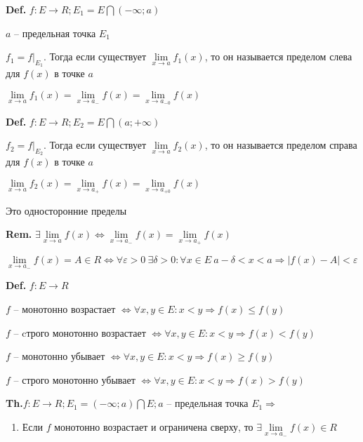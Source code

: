\documentclass[14pt, letter paper]{article}
\begin{document}
\textbf{Def.} $f : E \rightarrow R; E_1 = E \bigcap (-\infty; a)$

$a$ -- предельная точка $E_1$

$f_1 = f|_{E_1}$. Тогда если существует $\lim\limits_{x \rightarrow a}{f_1(x)}$, то он называется пределом слева для $f(x)$ в точке $a$

$\lim\limits_{x \rightarrow a}{f_1(x)} = \lim\limits_{x \rightarrow a_-}{f(x)} = \lim\limits_{x \rightarrow a_{-0}}{f(x)}$

\textbf{Def.} $f : E \rightarrow R; E_2 = E \bigcap (a; + \infty)$

$f_2 = f|_{E_2}$. Тогда если существует $\lim\limits_{x \rightarrow a}{f_2(x)}$, то он называется пределом справа для $f(x)$ в точке $a$

$\lim\limits_{x \rightarrow a}{f_2(x)} = \lim\limits_{x \rightarrow a_+}{f(x)} = \lim\limits_{x \rightarrow a_{+0}}{f(x)}$

Это односторонние пределы

\textbf{Rem.} $\exists \lim\limits_{x \rightarrow a}{f(x)} \Leftrightarrow \lim\limits_{x \rightarrow a_-}{f(x)} = \lim\limits_{x \rightarrow a_+}{f(x)}$

\vspace{5mm}

$\lim\limits_{x \rightarrow a_-}{f(x)} = A \in R \Leftrightarrow \forall \varepsilon > 0\ \exists \delta > 0 : \forall x \in E\ a - \delta < x < a \Rightarrow |f(x)-A| < \varepsilon$

\textbf{Def.} $f : E \rightarrow R$

$f$ -- монотонно возрастает $\Leftrightarrow \forall x, y \in E : x < y \Rightarrow f(x) \leq f(y)$

$f$ -- cтрого монотонно возрастает $\Leftrightarrow \forall x, y \in E : x < y \Rightarrow f(x) < f(y)$

$f$ -- монотонно убывает $\Leftrightarrow \forall x, y \in E : x < y \Rightarrow f(x) \geq f(y)$

$f$ -- строго монотонно убывает $\Leftrightarrow \forall x, y \in E : x < y \Rightarrow f(x) > f(y)$

\vspace{5mm}

\textbf{Th.}$f : E \rightarrow R; E_1 = (-\infty; a) \bigcap E; a$ -- предельная точка $E_1 \Rightarrow$

\begin{enumerate}
    \item Если $f$ монотонно возрастает и ограничена сверху, то $\exists \lim\limits_{x \rightarrow a_-}{f(x)} \in R$
\end{enumerate}
\end{document}
